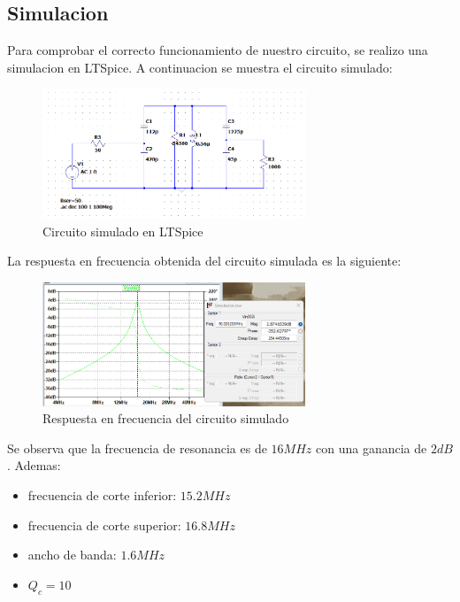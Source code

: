 \newpage
\subsection{Simulacion}

Para comprobar el correcto funcionamiento de nuestro circuito, se realizo una simulacion en LTSpice. A continuacion se muestra el circuito simulado:

\begin{figure}[h]
    \centering
    \includegraphics[width=0.7\textwidth]{Imagenes/circuito.png}
    \caption{Circuito simulado en LTSpice}
\end{figure}

La respuesta en frecuencia obtenida del circuito simulada es la siguiente:

\begin{figure}[h]
    \centering
    \includegraphics[width=0.7\textwidth]{Imagenes/resultado_circuito.png}
    \caption{Respuesta en frecuencia del circuito simulado}
\end{figure}

Se observa que la frecuencia de resonancia es de $16 MHz$ con una ganancia de $2 dB$. Ademas:

\begin{itemize}
    \item frecuencia de corte inferior: $15.2 MHz$
    \item frecuencia de corte superior: $16.8 MHz$
    \item ancho de banda: $1.6 MHz$
    \item $Q_c = 10$
\end{itemize}


